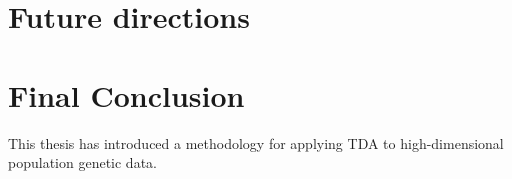 \section{Future directions}



\section{Final Conclusion}
This thesis has introduced a methodology for applying TDA to high-dimensional population genetic data. 